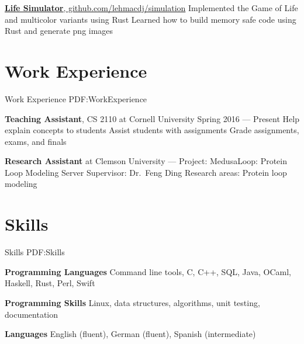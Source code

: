 \documentclass[letterpaper,10pt,oneside]{simpleresume}
\begin{document}
\begin{minipage}[t][0pt]{\linewidth}
\begin{body}
\href{https://www.github.com/lehmacdj/simulation}
{\textbf{Life Simulator}, github.com/lehmacdj/simulation}
\BulletItem%
Implemented the Game of Life and multicolor variants using Rust
\BulletItem%
Learned how to build memory safe code using Rust and generate png images

\section%
{Work Experience}
{Work Experience}
{PDF:WorkExperience}

\textbf{Teaching Assistant}, CS 2110 at Cornell University
\hfill
Spring 2016 --- Present
\BulletItem%
Help explain concepts to students
\BulletItem%
Assist students with assignments
\BulletItem%
Grade assignments, exams, and finals

\textbf{Research Assistant} at Clemson University
\hfill
{} --- 
\BulletItem%
Project:
MedusaLoop: Protein Loop Modeling Server
\BulletItem%
Supervisor:
Dr.\ Feng Ding
\BulletItem%
Research areas:
Protein loop modeling

\section%
{Skills}
{Skills}
{PDF:Skills}

\textbf{Programming Languages}
\BulletItem%
Command line tools, C, C++, SQL, Java, OCaml, Haskell, Rust, Perl, Swift

\textbf{Programming Skills}
\BulletItem%
Linux, data structures, algorithms, unit testing, documentation

\textbf{Languages}
\BulletItem%
English (fluent), German (fluent), Spanish (intermediate)
\end{body}

\end{minipage}
\end{document}
